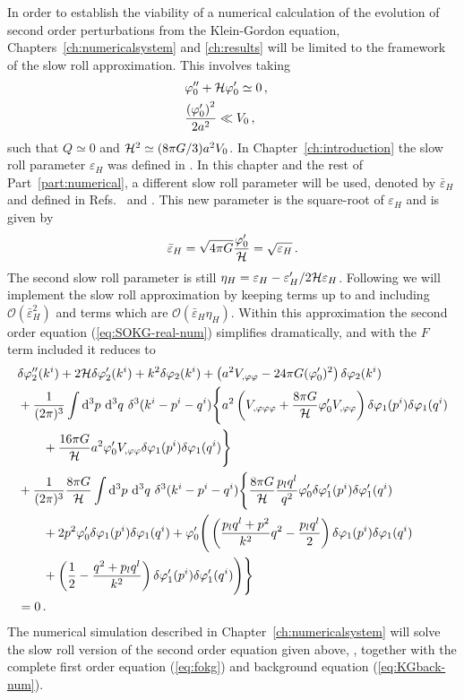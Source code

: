 In order to establish the viability of a numerical calculation of the evolution of
second order perturbations from the
Klein-Gordon equation, Chapters~\ref{ch:numericalsystem} and \ref{ch:results} will be limited to
the framework of the slow roll approximation. 
This involves taking
%
\begin{align}
 &\varphi_{0}'' + \mathcal{H} \varphi_{0}' \simeq 0\,,\quad \\
&\frac{\left(\varphi_{0}'\right)^2}{2a^2} \ll V_{0}\,,
\end{align}
%
such that $Q\simeq0$ and $\mathcal{H}^2 \simeq (8\pi G/3) a^2 V_{0}$. 
In Chapter~\ref{ch:introduction} the slow roll parameter $\varepsilon_H$ was
defined in . 
In this chapter and the rest of Part~\ref{part:numerical}, a different slow 
roll parameter will be used, denoted by
$\bar{\varepsilon}_H$ and defined in Refs.~\cite{Malik:2006ir} and
\cite{Seery:2005gb}. 
This new parameter is the square-root of $\varepsilon_H$ and is given by
%
\begin{equation}
\label{eq:bareps-defn-perts}
 \bar{\varepsilon}_H = \sqrt{4\pi G} \frac{\varphi_{0}'}{\mathcal{H}} = \sqrt{\varepsilon_H}\,.
\end{equation}
%
The second slow roll parameter is still $\eta_H = \varepsilon_H -
\varepsilon_H'/2\mathcal{H} \varepsilon_H$. Following  we
will implement the slow roll approximation by keeping terms up to and including
$\mathcal{O}(\bar{\varepsilon}^2_H)$ and terms which are
$\mathcal{O}(\bar{\varepsilon}_H \eta_H)$. 
Within this approximation the second order equation (\ref{eq:SOKG-real-num})
simplifies dramatically, and with the $F$ term included it reduces to
%
\begin{align}
 \label{eq:KG2-fourier-sr-num}
&\dvp2''(\kvi)+2\H\dvp2'(\kvi)+k^2\dvp2(\kvi)
+\left(a^2
\Upp-{24 \pi G}(\vp_{0}')^2\right)
\dvp2(\kvi) \nonumber\\
%
&+ \frac{1}{(2\pi)^3}\int \d^3p\ \d^3q\ \delta^3(\kvi-\pvi-\qvi) \Bigg\{
a^2\left(\Uppp
+ \frac{8\pi G}{\H}\vp_{0}' \Upp\right)
 \dvp1(\pvi)\dvp1(\qvi) \nonumber \\
%
&\qquad +\frac{16\pi G}{\H}a^2
\vp_{0}'\Upp\dvp1(\pvi)\dvp1(\qvi)\Bigg\}
\nonumber \\
%
&+ \frac{1}{(2\pi)^3}\frac{8\pi G}{\H}
\int \d^3p\ \d^3q\ \delta^3(\kvi-\pvi-\qvi)  \Bigg\{
%
\frac{8\pi G}{\H}\frac{p_l q^l}{q^2}\vp_{0}'\dvp1'(\pvi)
\dvp1'(\qvi) \nonumber\\
% 
&\qquad+ 2p^2\vp_{0}' \dvp1(\pvi) \dvp1(\qvi)
%
+\vp_{0}'
\Bigg(
\left(\frac{p_lq^l+p^2}{k^2}q^2-\frac{p_lq^l}{2}\right)
\dvp1(\pvi)\dvp1(\qvi) \nonumber \\
% 
&\qquad+\left(\frac{1}{2}-\frac{q^2+p_lq^l}{k^2}\right)
\dvp1'(\pvi)\dvp1'(\qvi)\Bigg)
\Bigg\} \nonumber \\
% 
&=0 \,.
\end{align}
%
The numerical simulation described in Chapter~\ref{ch:numericalsystem} will solve the
slow roll version of the second order equation given above,
, together with the complete first
order equation (\ref{eq:fokg}) and background equation
(\ref{eq:KGback-num}). 
% 
% 
% 
% 
